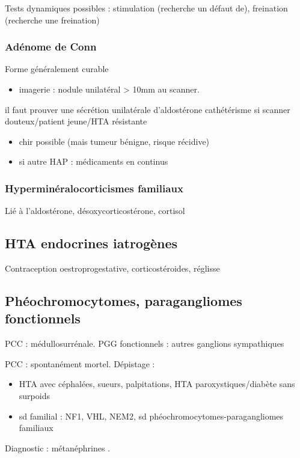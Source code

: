 \documentclass[11pt]{article}
\begin{document}
Tests dynamiques possibles : stimulation (recherche un défaut de), freination
(recherche une freination)

\subsubsection{Adénome de Conn}
\label{sec:org0892723}
Forme généralement curable
\begin{itemize}
\item imagerie : nodule unilatéral > 10mm au scanner.
\end{itemize}
\danger il faut prouver une sécrétion unilatérale d'aldostérone \thus
cathétérisme si scanner douteux/patient jeune/HTA résistante
\begin{itemize}
\item chir possible (mais tumeur bénigne, risque récidive)
\item si autre HAP : médicaments en continus
\end{itemize}

\subsubsection{Hyperminéralocorticismes familiaux}
\label{sec:org7068ea1}
Lié à l'aldostérone, désoxycorticostérone, cortisol

\subsection{HTA endocrines iatrogènes}
\label{sec:orgeef8688}
Contraception oestroprogestative, corticostéroides, réglisse

\subsection{Phéochromocytomes, paragangliomes fonctionnels}
\label{sec:org92c631a}
\gls{PCC} : médullosurrénale. \gls{PGG} fonctionnels : autres    ganglions sympathiques

PCC : spontanément mortel. Dépistage :
\begin{itemize}
\item HTA avec céphalées, sueurs, palpitations, HTA paroxystiques/diabète sans
surpoids
\item sd familial : \gls{NF1}, \gls{VHL}, \gls{NEM2}, sd phéochromocytomes-paragangliomes familiaux
\end{itemize}

Diagnostic : métanéphrines \inc.
\end{document}
